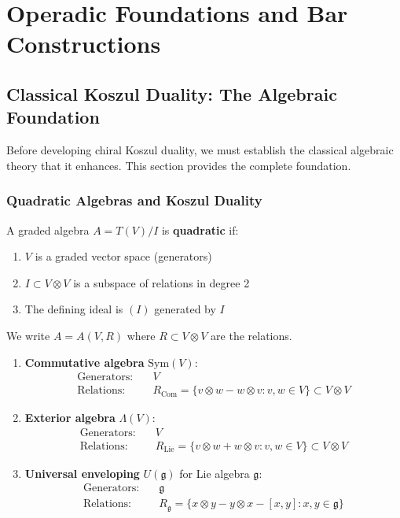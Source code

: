 \chapter{Operadic Foundations and Bar Constructions}

\section{Classical Koszul Duality: The Algebraic Foundation}
\label{sec:classical-koszul-foundation}

Before developing chiral Koszul duality, we must establish the classical algebraic theory that it enhances. This section provides the complete foundation.

\subsection{Quadratic Algebras and Koszul Duality}

\begin{definition}
\label{def:quadratic-algebra}
A graded algebra $A = T(V)/I$ is \textbf{quadratic} if:
\begin{enumerate}
\item $V$ is a graded vector space (generators)
\item $I \subset V \otimes V$ is a subspace of relations in degree 2
\item The defining ideal is $(I)$ generated by $I$
\end{enumerate}
We write $A = A(V, R)$ where $R \subset V \otimes V$ are the relations.
\end{definition}

\begin{example}
\label{ex:classical-quadratic-algebras}
\begin{enumerate}
\item \textbf{Commutative algebra} $\text{Sym}(V)$:
\begin{align}
\text{Generators:} &\quad V \\
\text{Relations:} &\quad R_{\text{Com}} = \{v \otimes w - w \otimes v : v,w \in V\} \subset V \otimes V
\end{align}

\item \textbf{Exterior algebra} $\Lambda(V)$:
\begin{align}
\text{Generators:} &\quad V \\
\text{Relations:} &\quad R_{\text{Lie}} = \{v \otimes w + w \otimes v : v,w \in V\} \subset V \otimes V
\end{align}

\item \textbf{Universal enveloping} $U(\mathfrak{g})$ for Lie algebra $\mathfrak{g}$:
\begin{align}
\text{Generators:} &\quad \mathfrak{g} \\
\text{Relations:} &\quad R_{\mathfrak{g}} = \{x \otimes y - y \otimes x - [x,y] : x,y \in \mathfrak{g}\}
\end{align}
\end{enumerate}
\end{example}

